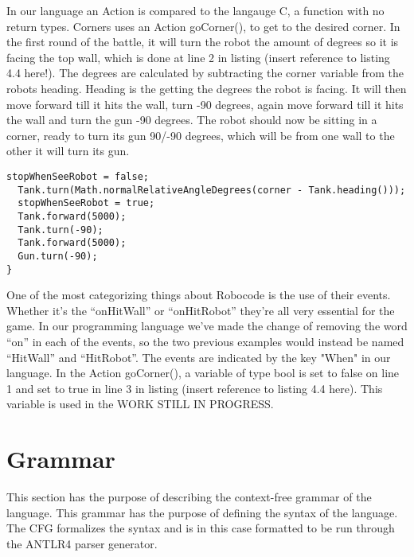 In our language an Action is compared to the langauge C, a function with no return types. Corners uses an Action goCorner(), to get to the desired corner. In the first round of the battle, it will turn the robot the amount of degrees so it is facing the top wall, which is done at line 2 in listing (insert reference to listing 4.4 here!). The degrees are calculated by subtracting the corner variable from the robots heading. Heading is the getting the degrees the robot is facing. It will then move forward till it hits the wall, turn -90 degrees, again  move forward till it hits the wall and turn the gun -90 degrees. The robot should now be sitting in a corner, ready to turn its gun 90/-90 degrees, which will be from one wall to the other it will turn its gun.

\begin{lstlisting}[caption={Code listing of the Action goCorner()} label=corners3, xleftmargin=.2\textwidth]
  stopWhenSeeRobot = false;  
  Tank.turn(Math.normalRelativeAngleDegrees(corner - Tank.heading()));      
  stopWhenSeeRobot = true;
  Tank.forward(5000);
  Tank.turn(-90);
  Tank.forward(5000);
  Gun.turn(-90);
}
\end{lstlisting}

One of the most categorizing things about Robocode is the use of their events. Whether it’s the “onHitWall” or “onHitRobot” they’re all very essential for the game. In our programming language we’ve made the change of removing the word “on” in each of the events, so the two previous examples would instead be named “HitWall” and “HitRobot”. The events are indicated by the key "When" in our language.
In the Action goCorner(), a variable of type bool is set to false on line 1 and set to true in line 3 in listing (insert reference to listing 4.4 here). This variable is used in the WORK STILL IN PROGRESS.

\section{Grammar}
\label{sec:Grammar}
This section has the purpose of describing the context-free grammar of the language. This grammar has the purpose of defining the syntax of the language. The CFG formalizes the syntax and is in this case formatted to be run through the ANTLR4 parser generator.

